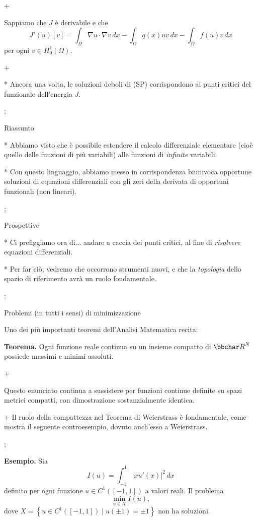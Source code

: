 \pg+

Sappiamo che $J$ \`e derivabile e che
$$
J'(u)[v] = \int_\Omega \nabla u \cdot \nabla v \, dx - \int_\Omega
q(x) uv\, dx - \int_\Omega f(u)v\, dx
$$
per ogni $v \in H_0^1(\Omega)$.

\pg+

* Ancora una volta, le soluzioni deboli di (SP) corrispondono ai punti
  critici del funzionale dell'energia $J$.

\pg;

\sec Riassunto

* Abbiamo visto che \`e possibile estendere il calcolo differenziale
elementare (cio\`e quello delle funzioni di pi\`u variabili) alle
funzioni di {\em infinite} variabili.

* Con questo linguaggio, abbiamo messo in corrispondenza biunivoca
  opportune soluzioni di equazioni differenziali con gli zeri della
  derivata di opportuni funzionali (non lineari).

\pg;

\sec Prospettive

* Ci prefiggiamo ora di... andare a caccia dei punti critici, al fine
  di {\em risolvere} equazioni differenziali.

* Per far ci\`o, vedremo che occorrono strumenti nuovi, e che la {\em
  topologia} dello spazio di riferimento avr\`a un ruolo fondamentale.

\pg;

\sec Problemi (in tutti i sensi) di minimizzazione

Uno dei pi\`u importanti teoremi dell'Analisi Matematica recita:

\medskip

{\bf Teorema.} Ogni funzione reale continua su un insieme compatto di $\R^N$
possiede massimi e minimi assoluti.

\pg+

Questo enunciato continua a sussistere per funzioni continue definite
su spazi metrici compatti, con dimostrazione sostanzialmente identica.

\pg+ Il ruolo della compattezza nel Teorema di Weierstrass \`e
fondamentale, come mostra il seguente controesempio, dovuto anch'esso
a Weierstrass.

\pg;

{\bf Esempio.} Sia
$$
I(u) = \int_{-1}^1 \left| x u'(x) \right|^2 \, dx
$$
definito per ogni funzione $u \in C^1([-1,1])$ a valori reali. Il
problema
$$
\min_{u \in X} I(u),
$$
dove $X = \left\{ u \in C^1([-1,1]) \mid u(\pm 1) = \pm 1 \right\}$
non ha soluzioni.

